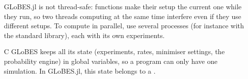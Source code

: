 \begin{note}
GLoBES.jl is not thread-safe: functions make their setup the current one while
they run, so two threads computing at the same time interfere even if they use
different setups. To compute in parallel, use several processes (for instance
with the  standard library), each with its own experiments.
\end{note}

\begin{cdiff}
C GLoBES keeps all its state (experiments, rates, minimiser settings, the
probability engine) in global variables, so a program can only have one
simulation. In GLoBES.jl, this state belongs to a .
\end{cdiff}
